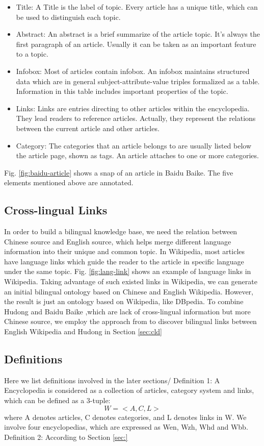 \documentclass[runningheads,a4paper]{llncs}
\begin{document}
\begin{itemize}
  \item Title: A Title is the label of topic. Every article has a unique title, which can be used to distinguish each topic.
  \item Abstract: An abstract is a brief summarize of the article topic. It's always the first paragraph of an article. Usually it can be taken as an important feature to a topic. 
  \item Infobox: Most of articles contain infobox. An infobox maintains structured data which are in general subject-attribute-value triples formalized as a table. Information in this table includes important properties of the topic.
  \item Links: Links are entries directing to other articles within the encyclopedia. They lead readers to reference articles. Actually, they represent the relations between the current article and other articles.
  \item Category: The categories that an article belongs to are usually listed below the article page, shown as tags. An article attaches to one or more categories.
\end{itemize}
Fig. \ref{fig:baidu-article} shows a snap of an article in Baidu Baike. The five elements mentioned above are annotated.
\subsection{Cross-lingual Links}
In order to build a bilingual knowledge base, we need the relation between Chinese source and English source, which helps merge different language information into their unique and common topic. In Wikipedia, most articles have language links which guide the reader to the article in specific language under the same topic. Fig. \ref{fig:lang-link} shows an example of language links in Wikipedia. Taking advantage of such existed links in Wikipedia, we can generate an initial bilingual ontology based on Chinese and English Wikipedia. However, the result is just an ontology based on Wikipedia, like DBpedia. To combine Hudong and Baidu Baike ,which are lack of cross-lingual information but more Chinese source, we employ the approach from \cite{} to discover bilingual links between English Wikipedia and Hudong in Section \ref{sec:cld}  

\subsection{Definitions}
Here we list definitions involved in the later sections/
Definition 1: A Encyclopedia is considered as a collection of articles, category system and links, which can be defined as a 3-tuple:
\begin{equation}
W = <A,C,L>
\end{equation} 
where A denotes articles, C denotes categories, and L denotes links in W.
We involve four encyclopedias, which are expressed as Wen, Wzh, Whd and Wbb.
Definition 2: According to Section \ref {sec:} 
\end{document}
